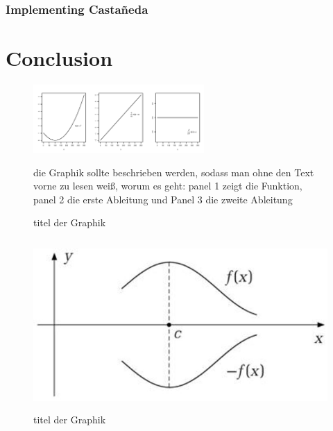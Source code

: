 \documentclass[a4paper,12pt]{article}
\begin{document}
\subsubsection{Implementing Casta\~{n}eda}
\section{Conclusion}
\label{Chapter6}


\newpage





\newpage

\begin{figure}
\caption{titel der Graphik} 
\label{fig:ersteGraphik}	%
\centering
\includegraphics[width=6.5cm]{abb1.png}  %

\begin{minipage}{0.8\linewidth}
\footnotesize{die Graphik sollte beschrieben werden, sodass man ohne den Text vorne zu lesen wei\ss{}, worum es geht: panel 1 zeigt die Funktion, panel 2 die erste Ableitung und Panel 3 die zweite Ableitung}
\end{minipage}

\end{figure}

\begin{figure}
\caption{titel der Graphik}
\label{fig:andereGraphik} \centering
\includegraphics[angle=90,height=6.5cm]{abb2.jpg}  %

\end{figure}
\end{document}
